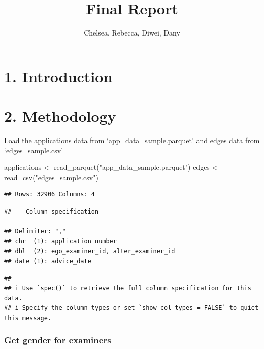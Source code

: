 \documentclass[
]{article}
\title{Final Report}
\author{Chelsea, Rebecca, Diwei, Dany}
\date{}
\newenvironment{Shaded}{\begin{snugshade}}{\end{snugshade}}
\newcommand{\FunctionTok}[1]{\textcolor[rgb]{0.00,0.00,0.00}{#1}}
\newcommand{\NormalTok}[1]{#1}
\newcommand{\OtherTok}[1]{\textcolor[rgb]{0.56,0.35,0.01}{#1}}
\newcommand{\StringTok}[1]{\textcolor[rgb]{0.31,0.60,0.02}{#1}}
\begin{document}
\maketitle

\hypertarget{introduction}{%
\section{1. Introduction}\label{introduction}}

\hypertarget{methodology}{%
\section{2. Methodology}\label{methodology}}

Load the applications data from `app\_data\_sample.parquet' and edges
data from `edges\_sample.csv'

\begin{Shaded}
\begin{Highlighting}[]
\NormalTok{applications }\OtherTok{\textless{}{-}} \FunctionTok{read\_parquet}\NormalTok{(}\StringTok{"app\_data\_sample.parquet"}\NormalTok{)}
\NormalTok{edges }\OtherTok{\textless{}{-}} \FunctionTok{read\_csv}\NormalTok{(}\StringTok{"edges\_sample.csv"}\NormalTok{)}
\end{Highlighting}
\end{Shaded}

\begin{verbatim}
## Rows: 32906 Columns: 4
\end{verbatim}

\begin{verbatim}
## -- Column specification --------------------------------------------------------
## Delimiter: ","
## chr  (1): application_number
## dbl  (2): ego_examiner_id, alter_examiner_id
## date (1): advice_date
\end{verbatim}

\begin{verbatim}
## 
## i Use `spec()` to retrieve the full column specification for this data.
## i Specify the column types or set `show_col_types = FALSE` to quiet this message.
\end{verbatim}

\hypertarget{get-gender-for-examiners}{%
\subsubsection{Get gender for
examiners}\label{get-gender-for-examiners}}
\end{document}
